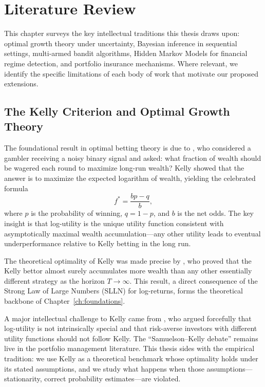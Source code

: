 \chapter{Literature Review}
\label{ch:literature}

This chapter surveys the key intellectual traditions this thesis draws upon:
optimal growth theory under uncertainty, Bayesian inference in sequential
settings, multi-armed bandit algorithms, Hidden Markov Models for financial
regime detection, and portfolio insurance mechanisms. Where relevant, we
identify the specific limitations of each body of work that motivate our
proposed extensions.

\section{The Kelly Criterion and Optimal Growth Theory}

The foundational result in optimal betting theory is due to
\textcite{kelly1956new}, who considered a gambler receiving a noisy binary
signal and asked: what fraction of wealth should be wagered each round to
maximize long-run wealth? Kelly showed that the answer is to maximize the
expected logarithm of wealth, yielding the celebrated formula
\[
    f^* = \frac{bp - q}{b},
\]
where $p$ is the probability of winning, $q = 1-p$, and $b$ is the net odds.
The key insight is that log-utility is the unique utility function consistent
with asymptotically maximal wealth accumulation---any other utility leads to
eventual underperformance relative to Kelly betting in the long run.

The theoretical optimality of Kelly was made precise by \textcite{breiman1961},
who proved that the Kelly bettor almost surely accumulates more wealth than any
other essentially different strategy as the horizon $T \to \infty$. This
result, a direct consequence of the Strong Law of Large Numbers (SLLN) for
log-returns, forms the theoretical backbone of Chapter~\ref{ch:foundations}.

A major intellectual challenge to Kelly came from \textcite{samuelson1979},
who argued forcefully that log-utility is not intrinsically special and that
risk-averse investors with different utility functions should not follow Kelly.
The ``Samuelson--Kelly debate'' remains live in the portfolio management
literature. This thesis sides with the empirical tradition: we use Kelly as a
theoretical benchmark whose optimality holds under its stated assumptions, and
we study what happens when those assumptions---stationarity, correct probability
estimates---are violated.

